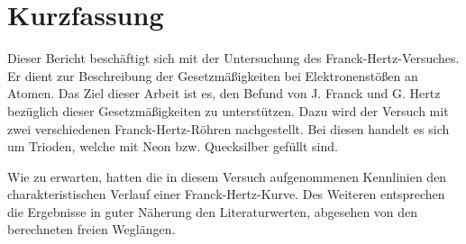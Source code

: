 \section{Kurzfassung}

Dieser Bericht beschäftigt sich mit der Untersuchung des Franck-Hertz-Versuches.
Er dient zur Beschreibung der Gesetzmäßigkeiten bei Elektronenstößen an Atomen.
Das Ziel dieser Arbeit ist es, den Befund von J. Franck und G. Hertz bezüglich dieser Gesetzmäßigkeiten zu unterstützen.
Dazu wird der Versuch mit zwei verschiedenen Franck-Hertz-Röhren nachgestellt.
Bei diesen handelt es sich um Trioden, welche mit Neon bzw. Quecksilber gefüllt sind.

Wie zu erwarten, hatten die in diesem Versuch aufgenommenen Kennlinien den charakteristischen Verlauf einer Franck-Hertz-Kurve.
Des Weiteren entsprechen die Ergebnisse in guter Näherung den Literaturwerten, abgesehen von den berechneten freien Weglängen. %